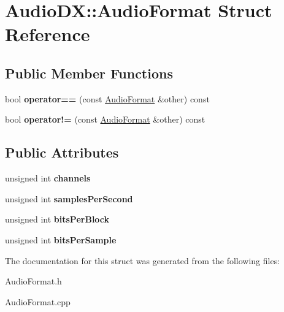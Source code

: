 \hypertarget{struct_audio_d_x_1_1_audio_format}{\section{Audio\-D\-X\-:\-:Audio\-Format Struct Reference}
\label{struct_audio_d_x_1_1_audio_format}
}
\subsection*{Public Member Functions}
\begin{DoxyCompactItemize}
\item 
\hypertarget{struct_audio_d_x_1_1_audio_format_aae4df65348ca1230851036bb9fd91050}{bool {\bfseries operator==} (const \hyperlink{struct_audio_d_x_1_1_audio_format}{Audio\-Format} \&other) const }\label{struct_audio_d_x_1_1_audio_format_aae4df65348ca1230851036bb9fd91050}

\item 
\hypertarget{struct_audio_d_x_1_1_audio_format_a328ce800ed9717ce42c7bcab0fb176a2}{bool {\bfseries operator!=} (const \hyperlink{struct_audio_d_x_1_1_audio_format}{Audio\-Format} \&other) const }\label{struct_audio_d_x_1_1_audio_format_a328ce800ed9717ce42c7bcab0fb176a2}

\end{DoxyCompactItemize}
\subsection*{Public Attributes}
\begin{DoxyCompactItemize}
\item 
\hypertarget{struct_audio_d_x_1_1_audio_format_abb4ac7cdfaee71a384f897fb66dfbf6f}{unsigned int {\bfseries channels}}\label{struct_audio_d_x_1_1_audio_format_abb4ac7cdfaee71a384f897fb66dfbf6f}

\item 
\hypertarget{struct_audio_d_x_1_1_audio_format_abb6d613e6aa6fe3ea89346f928682ac2}{unsigned int {\bfseries samples\-Per\-Second}}\label{struct_audio_d_x_1_1_audio_format_abb6d613e6aa6fe3ea89346f928682ac2}

\item 
\hypertarget{struct_audio_d_x_1_1_audio_format_a1d3af66864e53a267e9b49b1689e7215}{unsigned int {\bfseries bits\-Per\-Block}}\label{struct_audio_d_x_1_1_audio_format_a1d3af66864e53a267e9b49b1689e7215}

\item 
\hypertarget{struct_audio_d_x_1_1_audio_format_a6fb2f886f394562d4b1c8d4f7986f59e}{unsigned int {\bfseries bits\-Per\-Sample}}\label{struct_audio_d_x_1_1_audio_format_a6fb2f886f394562d4b1c8d4f7986f59e}

\end{DoxyCompactItemize}


The documentation for this struct was generated from the following files\-:\begin{DoxyCompactItemize}
\item 
Audio\-Format.\-h\item 
Audio\-Format.\-cpp\end{DoxyCompactItemize}
